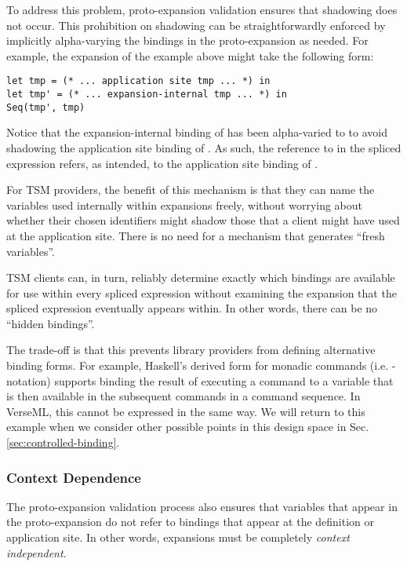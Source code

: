 To address this problem, proto-expansion validation ensures that shadowing does not occur. This prohibition on shadowing can be straightforwardly enforced by implicitly alpha-varying the bindings in the proto-expansion as needed. For example, the expansion of the example above might take the following form:
\begin{lstlisting}[numbers=none]
let tmp = (* ... application site tmp ... *) in 
let tmp' = (* ... expansion-internal tmp ... *) in 
Seq(tmp', tmp)
\end{lstlisting}
Notice that the expansion-internal binding of  has been alpha-varied to  to avoid shadowing the application site binding of . As such, the reference to  in the spliced expression refers, as intended, to the application site binding of .

For TSM providers, the benefit of this mechanism is that they can name the variables used internally within expansions freely, without worrying about whether their chosen identifiers might shadow those that a client might have used at the application site. There is no need for a mechanism that generates ``fresh variables''.

TSM clients can, in turn, reliably determine exactly which bindings are available for use within every spliced expression without examining the expansion that the spliced expression eventually appears within. In other words, there can be no ``hidden bindings''. 

The trade-off is that this prevents library providers from defining  alternative binding forms. For example, Haskell's derived form for monadic commands (i.e. -notation) supports binding the result of executing a command to a variable that is then available in the subsequent commands in a command sequence. In VerseML, this cannot be expressed in the same way. 
We will return to this example when we consider other possible points in this design space in Sec. \ref{sec:controlled-binding}.


\subsubsection{Context Dependence}
The proto-expansion validation process also ensures that variables that appear in the proto-expansion do not refer to bindings that appear at the definition or application site. In other words, expansions must be completely \emph{context independent}. 

